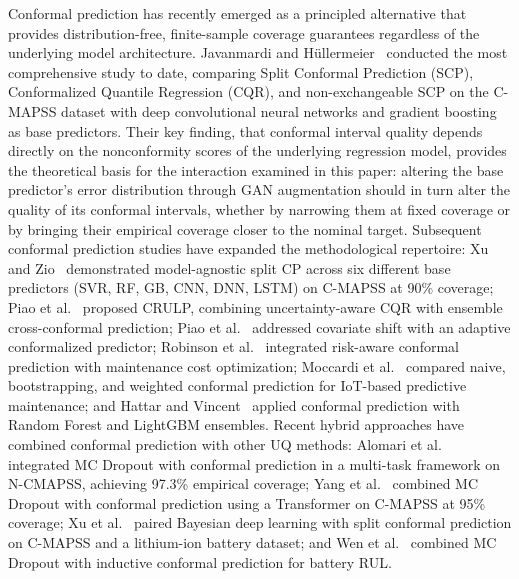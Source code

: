 Conformal prediction has recently emerged as a principled alternative
that provides distribution-free, finite-sample coverage guarantees
regardless of the underlying model architecture.
Javanmardi and H{\"u}llermeier~\cite{javanmardi_conformal_2023}
conducted the most comprehensive study to date, comparing Split
Conformal Prediction (SCP), Conformalized Quantile Regression (CQR),
and non-exchangeable SCP on the C-MAPSS dataset with deep
convolutional neural networks and gradient boosting as base
predictors. Their key finding, that conformal interval quality depends
directly on the nonconformity scores of the underlying regression
model, provides the theoretical basis for the interaction examined in
this paper: altering the base predictor's error distribution through
GAN augmentation should in turn alter the quality of its conformal
intervals, whether by narrowing them at fixed coverage or by bringing
their empirical coverage closer to the nominal target. Subsequent
conformal prediction studies
have expanded the methodological repertoire:
Xu and Zio~\cite{10381131} demonstrated model-agnostic split CP
across six different base predictors (SVR, RF, GB, CNN, DNN, LSTM)
on C-MAPSS at 90\% coverage;
Piao et al.~\cite{10816036} proposed CRULP, combining
uncertainty-aware CQR with ensemble cross-conformal prediction;
Piao et al.~\cite{11163867} addressed covariate shift with an
adaptive conformalized predictor;
Robinson et al.~\cite{robinson_remaining_2026} integrated risk-aware
conformal prediction with maintenance cost optimization;
Moccardi et al.~\cite{fi17060244} compared naive, bootstrapping, and
weighted conformal prediction for IoT-based predictive maintenance;
and Hattar and Vincent~\cite{11044907} applied conformal prediction
with Random Forest and LightGBM ensembles. Recent hybrid
approaches have combined conformal prediction with other UQ methods:
Alomari et al.~\cite{11488562} integrated MC Dropout with conformal
prediction in a multi-task framework on N-CMAPSS, achieving 97.3\%
empirical coverage;
Yang et al.~\cite{yang_uncertainty_2026} combined MC Dropout with
conformal prediction using a Transformer on C-MAPSS at 95\% coverage;
Xu et al.~\cite{xu_novel_2026} paired Bayesian deep learning with
split conformal prediction on C-MAPSS and a lithium-ion battery
dataset; and
Wen et al.~\cite{en19020414} combined MC Dropout with inductive
conformal prediction for battery RUL.\\

